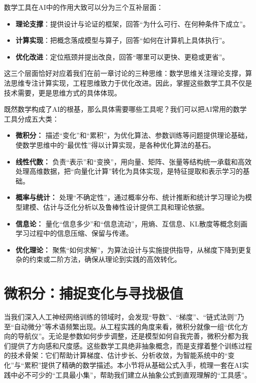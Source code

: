 数学工具在AI中的作用大致可以分为三个互补层面：
\begin{itemize}
\item \textbf{理论支撑}：提供设计与论证的框架，回答“为什么可行、在何种条件下成立”。 
\item \textbf{计算实现}：把概念落成模型与算子，回答“如何在计算机上具体执行”。 
\item \textbf{优化改进}：定位瓶颈并提出改良，回答“哪里可以更快、更稳或更省”。
\end{itemize}

这三个层面恰好对应着我们在前一章讨论的三种思维：数学思维关注理论支撑，算法思维专注计算实现，工程思维致力于优化改进。因此，掌握这些数学工具不仅是技术需要，更是思维方式的具体体现。

既然数学构成了AI的根基，那么具体需要哪些工具呢？我们可以把AI常用的数学工具分成五大类：
\begin{itemize}
  \item \textbf{微积分：} 描述“变化”和“累积”，为优化算法、参数训练等问题提供理论基础，使数学思维中的“最优性”得以计算实现，是各种优化算法的基石。
  \item \textbf{线性代数：} 负责“表示”和“变换”，用向量、矩阵、张量等结构统一承载和高效处理高维数据，把“向量化计算”转化为具体实现，是特征提取和表示学习的基础。
  \item \textbf{概率与统计：} 处理“不确定性”，通过概率分布、统计推断和统计学习理论为模型建模、估计与泛化分析以及鲁棒性设计提供工具和理论依据。
  \item \textbf{信息论：} 量化“信息多少”和“信息流动”，用熵、互信息、KL散度等概念刻画学习过程中的信息压缩、保留与传递。
  \item \textbf{优化理论：} 聚焦“如何求解”，为算法设计与实施提供指导，从梯度下降到更复杂的约束或二阶方法，确保从理论到实践的高效转化。
\end{itemize}


\section{微积分：捕捉变化与寻找极值}

当我们深入人工神经网络训练的领域时，会发现``导数''、``梯度''、``链式法则''乃至``自动微分''等术语频繁出现。从工程实践的角度来看，微积分就像一组``优化方向的导航仪''。无论是参数如何步步调整，还是模型如何自我完善，微积分都为我们提供了方向感和尺度感。这些数学工具绝非抽象概念，而是支撑着整个训练过程的技术骨架：它们帮助计算梯度、估计步长、分析收敛，为智能系统中的``变化''与``累积''提供了精确的数学描述。本小节将从基础公式入手，梳理一套在AI实践中必不可少的``工具最小集''，帮助我们建立从抽象公式到直观理解的``工具感''。


